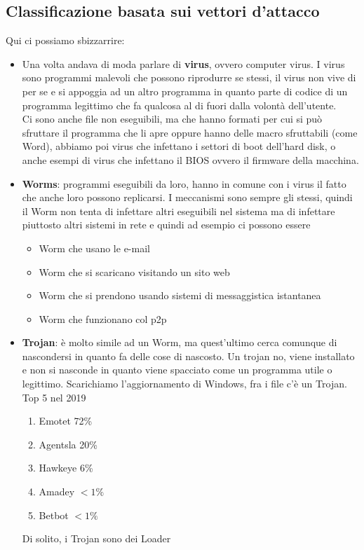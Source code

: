 \documentclass[12pt, oneside]{extbook}
\begin{document}
\subsection{Classificazione basata sui vettori d'attacco}
Qui ci possiamo sbizzarrire: 
\begin{itemize}
\item Una volta andava di moda parlare di \textbf{virus}, ovvero computer virus. I virus sono programmi malevoli che possono riprodurre se stessi, il virus non vive di per se e si appoggia ad un altro programma in quanto parte di codice di un programma legittimo che fa qualcosa al di fuori dalla volontà dell'utente.\\ Ci sono anche file non eseguibili, ma che hanno formati per cui si può sfruttare il programma che li apre oppure hanno delle macro sfruttabili (come Word), abbiamo poi virus che infettano i settori di boot dell'hard disk, o anche esempi di virus che infettano il BIOS ovvero il firmware della macchina. 
\item \textbf{Worms}: programmi eseguibili da loro, hanno in comune con i virus il fatto che anche loro possono replicarsi. I meccanismi sono sempre gli stessi, quindi il Worm non tenta di infettare altri eseguibili nel sistema ma di infettare piuttosto altri sistemi in rete e quindi ad esempio ci possono essere
\begin{itemize}
\item Worm che usano le e-mail
\item Worm che si scaricano visitando un sito web
\item Worm che si prendono usando sistemi di messaggistica istantanea
\item Worm che funzionano col p2p
\end{itemize}
\item \textbf{Trojan}: è molto simile ad un Worm, ma quest'ultimo cerca comunque di nascondersi in quanto fa delle cose di nascosto. Un trojan no, viene installato e non si nasconde in quanto viene spacciato come un programma utile o legittimo. Scarichiamo l'aggiornamento di Windows, fra i file c'è un Trojan. Top 5 nel 2019
\begin{enumerate}
\item Emotet 72\%
\item Agentsla 20\%
\item Hawkeye 6\%
\item Amadey $< 1\%$
\item Betbot $< 1\%$
\end{enumerate}
Di solito, i Trojan sono dei Loader

\end{itemize}
\end{document}
